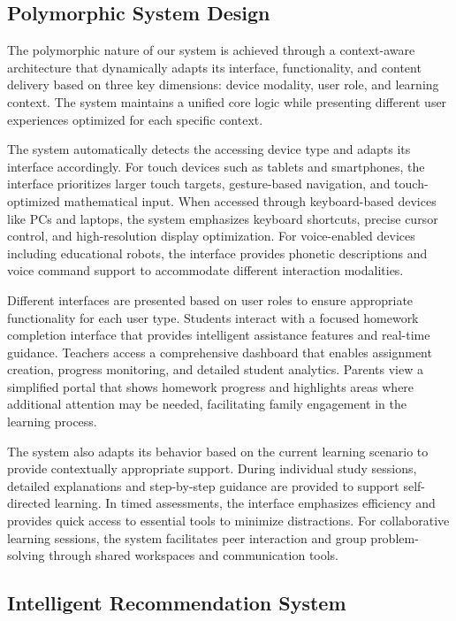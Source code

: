\documentclass[conference]{IEEEtran}
\begin{document}
\subsection{Polymorphic System Design}

The polymorphic nature of our system is achieved through a context-aware architecture that dynamically adapts its interface, functionality, and content delivery based on three key dimensions: device modality, user role, and learning context. The system maintains a unified core logic while presenting different user experiences optimized for each specific context.

The system automatically detects the accessing device type and adapts its interface accordingly. For touch devices such as tablets and smartphones, the interface prioritizes larger touch targets, gesture-based navigation, and touch-optimized mathematical input. When accessed through keyboard-based devices like PCs and laptops, the system emphasizes keyboard shortcuts, precise cursor control, and high-resolution display optimization. For voice-enabled devices including educational robots, the interface provides phonetic descriptions and voice command support to accommodate different interaction modalities.

Different interfaces are presented based on user roles to ensure appropriate functionality for each user type. Students interact with a focused homework completion interface that provides intelligent assistance features and real-time guidance. Teachers access a comprehensive dashboard that enables assignment creation, progress monitoring, and detailed student analytics. Parents view a simplified portal that shows homework progress and highlights areas where additional attention may be needed, facilitating family engagement in the learning process.

The system also adapts its behavior based on the current learning scenario to provide contextually appropriate support. During individual study sessions, detailed explanations and step-by-step guidance are provided to support self-directed learning. In timed assessments, the interface emphasizes efficiency and provides quick access to essential tools to minimize distractions. For collaborative learning sessions, the system facilitates peer interaction and group problem-solving through shared workspaces and communication tools.

\subsection{Intelligent Recommendation System}
\end{document}

